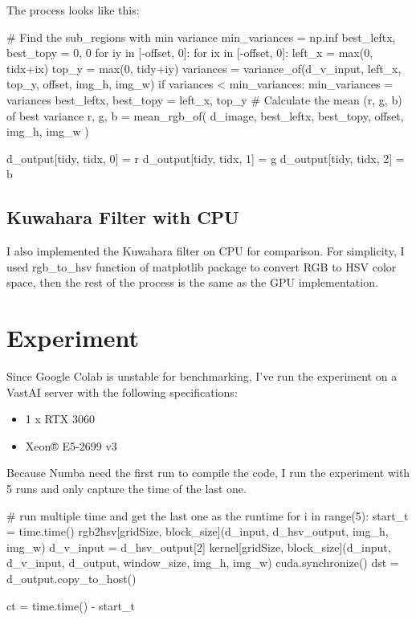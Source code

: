 \documentclass{article}
\begin{document}
The process looks like this:
\begin{spverbatim}
    # Find the sub_regions with min variance
    min_variances = np.inf
    best_leftx, best_topy = 0, 0
    for iy in [-offset, 0]:
        for ix in [-offset, 0]:
            left_x = max(0, tidx+ix)
            top_y = max(0, tidy+iy)
            variances = variance_of(d_v_input, left_x, top_y, offset, img_h, img_w)
            if variances < min_variances:
                min_variances = variances
                best_leftx, best_topy = left_x, top_y
    # Calculate the mean (r, g, b) of best variance
    r, g, b = mean_rgb_of(
        d_image,
        best_leftx, 
        best_topy, 
        offset, 
        img_h, img_w
    )
    
    d_output[tidy, tidx, 0] = r
    d_output[tidy, tidx, 1] = g
    d_output[tidy, tidx, 2] = b
\end{spverbatim}
\subsection{Kuwahara Filter with CPU}
I also implemented the Kuwahara filter on CPU for comparison. For simplicity, I used rgb\_to\_hsv function of matplotlib package to convert RGB to HSV color space, then the rest of the process is the same as the GPU implementation.

\section{Experiment}
Since Google Colab is unstable for benchmarking, I've run the experiment on a VastAI server with the following specifications:
\begin{itemize}
    \item 1 x RTX 3060
    \item Xeon® E5-2699 v3
\end{itemize}
Because Numba need the first run to compile the code, I run the experiment with 5 runs and only capture the time of the last one.
\begin{spverbatim}
# run multiple time and get the last one as the runtime
for i in range(5):
    start_t = time.time()
    rgb2hsv[gridSize, block_size](d_input, d_hsv_output, img_h, img_w)
    d_v_input = d_hsv_output[2]
    kernel[gridSize, block_size](d_input, d_v_input, d_output, window_size, img_h, img_w)
    cuda.synchronize()
    dst = d_output.copy_to_host()

ct = time.time() - start_t
\end{spverbatim}
\end{document}
